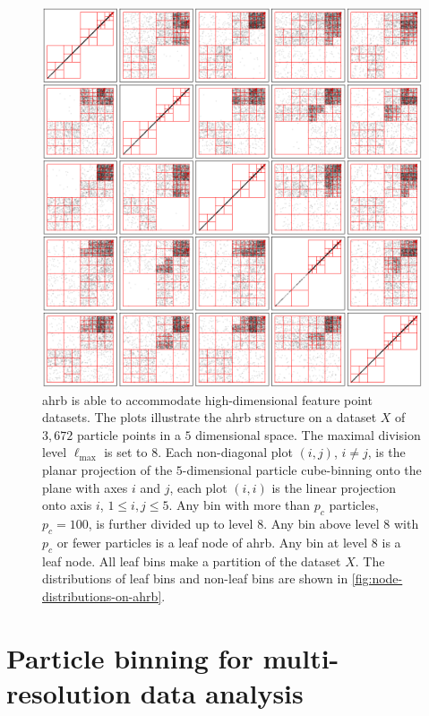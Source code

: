 \documentclass[final]{juliacon}
\begin{document}
\begin{figure}
  \centering
  \includegraphics[width=\linewidth]{images/block-sparse-dataset.png}
  \caption{%
    {\sc ahrb} is able to accommodate high-dimensional feature point
    datasets. The plots illustrate the {\sc ahrb} structure on a
    dataset $X$ of $3,672$ particle points in a $5$ dimensional
    space. The maximal division level $\ell_{\max}$ is set to $8$.
    Each non-diagonal plot $(i,j)$, $i\neq j$, is the planar
    projection of the $5$-dimensional particle cube-binning onto the
    plane with axes $i$ and $j$, each plot $(i,i)$ is the linear
    projection onto axis $i$, $1\leq i,j \leq 5$.  Any bin with more
    than $p_{c}$ particles, $p_{c}=100$, is further divided up to
    level $8$. Any bin above level $8$ with $p_c$ or fewer particles
    is a leaf node of {\sc ahrb}. Any bin at level $8$ is a leaf
    node. All leaf bins make a partition of the dataset $X$. The
    distributions of leaf bins and non-leaf bins are shown in
    \cref{fig:node-distributions-on-ahrb}.} %
  \label{fig:ahrb-structures-illustration} 
\end{figure} %



\section{Particle binning for multi-resolution data analysis}
\label{sec:introduction}
\end{document}
